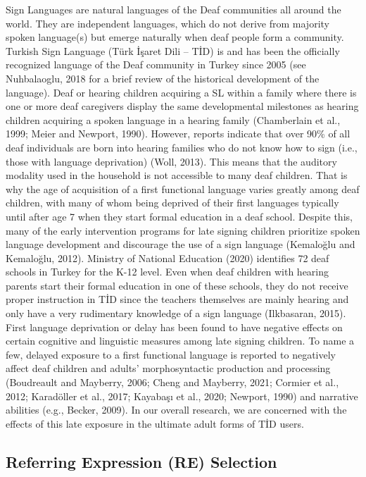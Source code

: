 \documentclass[]{elsarticle} %
\begin{document}
Sign Languages are natural languages of the Deaf communities all around
the world. They are independent languages, which do not derive from
majority spoken language(s) but emerge naturally when deaf people form a
community. Turkish Sign Language (Türk İşaret Dili -- TİD) is and has
been the officially recognized language of the Deaf community in Turkey
since 2005 (see Nuhbalaoglu, 2018 for a brief review of the historical
development of the language). Deaf or hearing children acquiring a SL
within a family where there is one or more deaf caregivers display the
same developmental milestones as hearing children acquiring a spoken
language in a hearing family (Chamberlain et al., 1999; Meier and
Newport, 1990). However, reports indicate that over 90\% of all deaf
individuals are born into hearing families who do not know how to sign
(i.e., those with language deprivation) (Woll, 2013). This means that
the auditory modality used in the household is not accessible to many
deaf children. That is why the age of acquisition of a first functional
language varies greatly among deaf children, with many of whom being
deprived of their first languages typically until after age 7 when they
start formal education in a deaf school. Despite this, many of the early
intervention programs for late signing children prioritize spoken
language development and discourage the use of a sign language
(Kemaloğlu and Kemaloğlu, 2012). Ministry of National Education (2020)
identifies 72 deaf schools in Turkey for the K-12 level. Even when deaf
children with hearing parents start their formal education in one of
these schools, they do not receive proper instruction in TİD since the
teachers themselves are mainly hearing and only have a very rudimentary
knowledge of a sign language (Ilkbasaran, 2015). First language
deprivation or delay has been found to have negative effects on certain
cognitive and linguistic measures among late signing children. To name a
few, delayed exposure to a first functional language is reported to
negatively affect deaf children and adults' morphosyntactic production
and processing (Boudreault and Mayberry, 2006; Cheng and Mayberry, 2021;
Cormier et al., 2012; Karadöller et al., 2017; Kayabaşı et al., 2020;
Newport, 1990) and narrative abilities (e.g., Becker, 2009). In our
overall research, we are concerned with the effects of this late
exposure in the ultimate adult forms of TİD users.

\hypertarget{referring-expression-re-selection}{%
\subsection{Referring Expression (RE)
Selection}\label{referring-expression-re-selection}}
\end{document}

